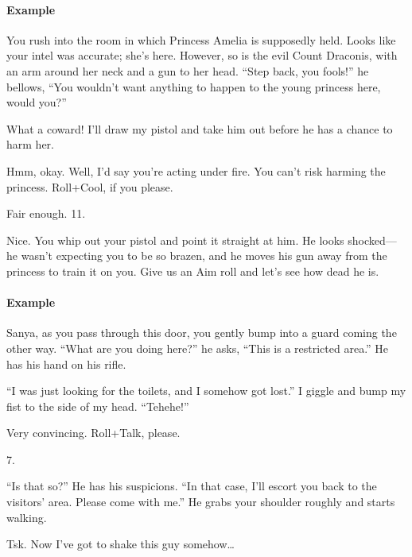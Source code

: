 
\paragraph{Example}
\begin{dialogue}
   You rush into the room in which Princess Amelia is
  supposedly held. Looks like your intel was accurate; she's
  here. However, so is the evil Count Draconis, with an arm around her
  neck and a gun to her head. ``Step back, you fools!'' he bellows,
  ``You wouldn't want anything to happen to the young princess here,
  would you?''

   What a coward! I'll draw my pistol and take him
  out before he has a chance to harm her.

   Hmm, okay. Well, I'd say you're acting under fire. You
  can't risk harming the princess. Roll+Cool, if you please.

   Fair enough. 11.

   Nice. You whip out your pistol and point it straight at him. 
  He looks shocked---he wasn't expecting you to be so brazen, and he
  moves his gun away from the princess to train it on you. Give us an
  Aim roll and let's see how dead he is.
\end{dialogue}





\paragraph{Example}
\begin{dialogue}
   Sanya, as you pass through this door, you gently bump
  into a guard coming the other way. ``What are you doing here?'' he
  asks, ``This is a restricted area.'' He has his hand on his rifle.

   ``I was just looking for the toilets, and I somehow
  got lost.'' I giggle and bump my fist to the side of my
  head. ``Tehehe!''

   Very convincing. Roll+Talk, please.

   7.

   ``Is that so?'' He has his suspicions. ``In that case,
  I'll escort you back to the visitors' area. Please come with me.''
  He grabs your shoulder roughly and starts walking.

   Tsk. Now I've got to shake this guy somehow\ldots
\end{dialogue}

